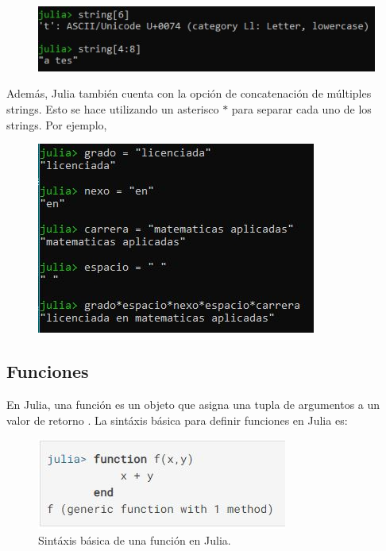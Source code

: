 \begin{figure}[h]
\begin{center}
\includegraphics[scale=0.8]{Imagenes/ejemplo_string_partes.JPG}
  \label{ejemplo_string_julia_partes}
\end{center}
\end{figure}

Además, Julia también cuenta con la opción de concatenación de múltiples strings. Esto se hace utilizando un asterisco $*$ para separar cada uno de los strings. Por ejemplo,

\begin{figure}[H]
\begin{center}
\includegraphics[scale=0.8]{Imagenes/ejemplo_concatenacion.JPG}
  \label{ejemplo_string_concatenacion}
\end{center}
\end{figure}

\subsection{Funciones}
En Julia, una función es un objeto que asigna una tupla de argumentos a un valor de retorno \citep{Julia_manual}. La sintáxis básica para definir funciones en Julia es:

\begin{figure}[h]
\begin{center}
\includegraphics[scale=0.6]{Imagenes/sintaxis_funcion.JPG}
 \caption{Sintáxis básica de una función en Julia.}
  \label{functions_sintax_Julia}
\end{center}
\end{figure}

